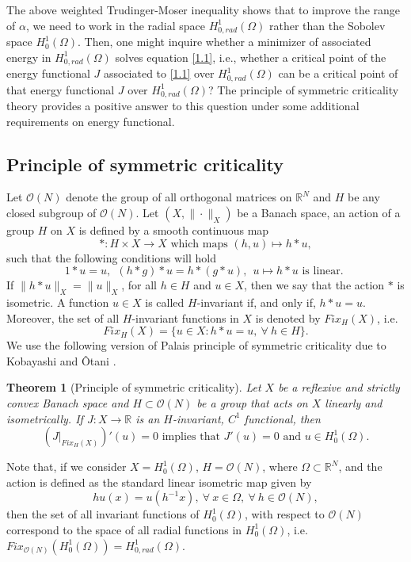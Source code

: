 \documentclass[11pt]{amsart}
\numberwithin{equation}{section}
\newtheorem{thm}{Theorem}[section]
\newcommand{\R}{\mathbb{R}}
\newcommand{\h}{H^1_0(\Omega)}
\newcommand{\hr}{H^1_{0, rad}(\Omega)}
\newcommand{\1}{\frac{1}{2}}
\begin{document}
	The above weighted Trudinger-Moser inequality shows that to improve the range of $\alpha$, we need to work in the radial space $\hr$ rather than the Sobolev space $\h$. Then, one might inquire whether a minimizer of associated energy in $\hr$ solves equation \eqref{1.1}, i.e., whether a critical point of the energy functional $J$ associated to \eqref{1.1} over $\hr$ can be a critical point of that energy functional $J$ over $\hr$? The principle of symmetric criticality theory provides a positive answer to this question under some additional requirements on energy functional. 
	\subsection{Principle of symmetric criticality} 
	Let $ \mathcal{O}(N) $ denote the group of all orthogonal matrices on $ \mathbb{R}^N $ and $H$ be any closed subgroup of $ \mathcal{O}(N) $. Let $(X, \|\cdot\|_X)$ be a Banach space, an action of a group $ H $ on $ X $ is defined by a smooth continuous map
	\[
	*: H \times X \to X \text{ which maps } (h,u) \mapsto h*u,
	\]
	such that the following conditions will hold
	\[ 1*u = u, \ \ (h*g)*u = h* (g*u),\ \ u \mapsto h*u \text{ is linear. }\]
	If $\|h*u\|_X = \|u\|_X$, for all $h\in H$ and $u\in X$, then we say that the action $*$ is isometric. A function $u\in X$ is called $H$-invariant if, and only if, $h*u = u$. Moreover, the set of all $H$-invariant functions in $X$ is denoted by $Fix_H(X)$, i.e.
	\[ Fix_H(X)= \{ u \in X : h*u=u, \ \forall \ h \in H\}.\]
	We use the following version of Palais principle of symmetric criticality \cite{Palais}  due to Kobayashi and \^Otani \cite{Kabayashi}.
	\begin{thm}[Principle of symmetric criticality]
		\label{thm1.3}
		Let $X$ be a reflexive and strictly convex Banach space and $H \subset \mathcal{O}(N)$ be a group that acts on $X$ linearly and isometrically. If $J : X \to \R$ is an $H$-invariant, $C^1$ functional, then 
		\[ (J|_{Fix_H(X)})'(u)=0 \text{ implies that } J'(u)=0 \text{ and } u \in \h.\]
	\end{thm}
	Note that, if we consider $X= \h$, $ H = \mathcal{O}(N) $, where $\Omega \subset \R^N$, and the action is defined as the standard linear isometric map given by 
	\[ h u (x) = u (h^{-1}x), \ \forall \  x \in \Omega, \ \forall \ h \in \mathcal{O}(N),\]
	then the set of all invariant functions of $\h$, with respect to $\mathcal{O}(N)$ correspond to the space of all radial functions in $\h $, i.e. $ Fix_{\mathcal{O}(N)}(\h)= \hr$.
	
\end{document}
